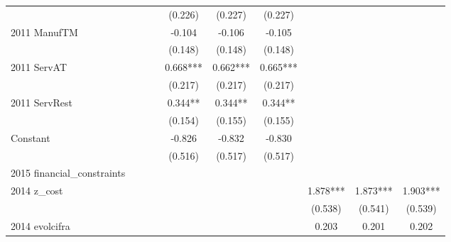 \begin{table}[htbp]
\begin{tabular}{l*{9}{c}}
                    &               &               &               &     (0.226)   &     (0.227)   &     (0.227)   &               &               &               \\
2011 ManufTM        &               &               &               &      -0.104   &      -0.106   &      -0.105   &               &               &               \\
                    &               &               &               &     (0.148)   &     (0.148)   &     (0.148)   &               &               &               \\
2011 ServAT         &               &               &               &       0.668***&       0.662***&       0.665***&               &               &               \\
                    &               &               &               &     (0.217)   &     (0.217)   &     (0.217)   &               &               &               \\
2011 ServRest       &               &               &               &       0.344** &       0.344** &       0.344** &               &               &               \\
                    &               &               &               &     (0.154)   &     (0.155)   &     (0.155)   &               &               &               \\
Constant            &               &               &               &      -0.826   &      -0.832   &      -0.830   &               &               &               \\
                    &               &               &               &     (0.516)   &     (0.517)   &     (0.517)   &               &               &               \\
\hline
2015 financial\_constraints&               &               &               &               &               &               &               &               &               \\
2014 z\_cost         &               &               &               &               &               &               &       1.878***&       1.873***&       1.903***\\
                    &               &               &               &               &               &               &     (0.538)   &     (0.541)   &     (0.539)   \\
2014 evolcifra      &               &               &               &               &               &               &       0.203   &       0.201   &       0.202   \\

\end{tabular}
\end{table}
